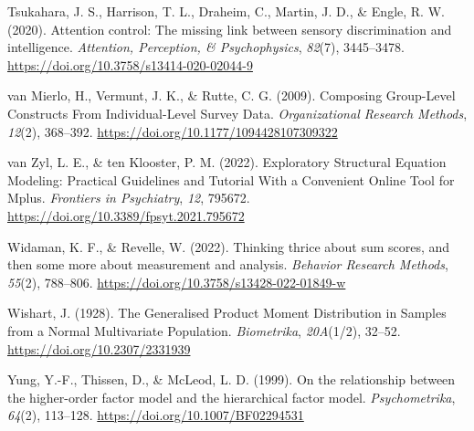 \documentclass[
  american,
  man,floatsintext]{apa7}
\newlength{\cslhangindent}
\newenvironment{CSLReferences}[2] %
 {\begin{list}{}{%
  \setlength{\itemindent}{0pt}
  \setlength{\leftmargin}{0pt}
  \setlength{\parsep}{0pt}
  \ifodd #1
   \setlength{\leftmargin}{\cslhangindent}
   \setlength{\itemindent}{-1\cslhangindent}
  \fi
  \setlength{\itemsep}{#2\baselineskip}}}
 {\end{list}}
\begin{document}
\begin{CSLReferences}{1}{0}
Tsukahara, J. S., Harrison, T. L., Draheim, C., Martin, J. D., \& Engle, R. W. (2020). Attention control: {The} missing link between sensory discrimination and intelligence. \emph{Attention, Perception, \& Psychophysics}, \emph{82}(7), 3445--3478. \url{https://doi.org/10.3758/s13414-020-02044-9}

van Mierlo, H., Vermunt, J. K., \& Rutte, C. G. (2009). Composing {Group-Level Constructs From Individual-Level Survey Data}. \emph{Organizational Research Methods}, \emph{12}(2), 368--392. \url{https://doi.org/10.1177/1094428107309322}

van Zyl, L. E., \& ten Klooster, P. M. (2022). Exploratory {Structural Equation Modeling}: {Practical Guidelines} and {Tutorial With} a {Convenient Online Tool} for {Mplus}. \emph{Frontiers in Psychiatry}, \emph{12}, 795672. \url{https://doi.org/10.3389/fpsyt.2021.795672}

Widaman, K. F., \& Revelle, W. (2022). Thinking thrice about sum scores, and then some more about measurement and analysis. \emph{Behavior Research Methods}, \emph{55}(2), 788--806. \url{https://doi.org/10.3758/s13428-022-01849-w}

Wishart, J. (1928). The {Generalised Product Moment Distribution} in {Samples} from a {Normal Multivariate Population}. \emph{Biometrika}, \emph{20A}(1/2), 32--52. \url{https://doi.org/10.2307/2331939}

Yung, Y.-F., Thissen, D., \& McLeod, L. D. (1999). On the relationship between the higher-order factor model and the hierarchical factor model. \emph{Psychometrika}, \emph{64}(2), 113--128. \url{https://doi.org/10.1007/BF02294531}

\end{CSLReferences}
\end{document}
